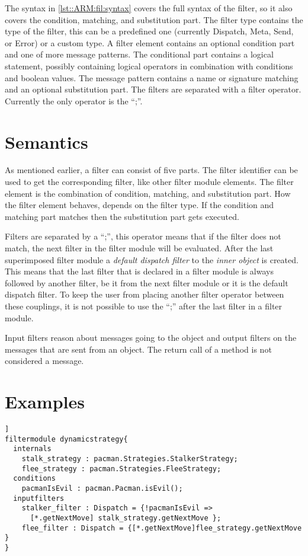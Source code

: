 The syntax in \autoref{lst::ARM:fil:syntax} covers the full syntax of the filter, so it also covers the condition, matching, and substitution part.
The filter type contains the type of the filter, this can be a predefined one (currently Dispatch, Meta, Send, or Error) or a custom type.
A filter element
contains an optional condition part and
one of more message patterns. The conditional part contains a logical statement, possibly containing logical operators in combination with conditions and boolean values. The message pattern contains a name or signature matching and an optional substitution part. The filters are separated with a filter operator. Currently the only operator is the ``;''.

\section*{Semantics}
As mentioned earlier, a filter can consist of five parts. The filter identifier can be used to get the corresponding filter,
like other filter module elements. The filter element is the combination of condition, matching, and substitution part.
How the filter element behaves, depends on the filter type. If the condition and matching part matches then the
substitution part gets executed.

Filters are separated by a ``;'', this operator means that if the filter does not match, the next filter in the filter module will be evaluated. After the last superimposed filter module a \emph{default dispatch filter} to the \emph{inner object} is created. This means that the last filter that is declared in a filter module is always followed by another filter, be it from the next filter module or it is the default dispatch filter. To keep the user from placing another filter operator between these couplings, it is not possible to use the ``;'' after the last filter in a filter module.%

Input filters reason about messages going to the object and output filters on the messages that are sent from an object. The return call of a method is not considered a message.

\section*{Examples}
\begin{lstlisting}[caption = {Dynamic strategy filter module in Pacman}, label=lst::arm::fil:example1,style = listing, language = ComposeStar,float=[tpb]]
filtermodule dynamicstrategy{
  internals
    stalk_strategy : pacman.Strategies.StalkerStrategy;
    flee_strategy : pacman.Strategies.FleeStrategy;
  conditions
    pacmanIsEvil : pacman.Pacman.isEvil();
  inputfilters
    stalker_filter : Dispatch = {!pacmanIsEvil => 
      [*.getNextMove] stalk_strategy.getNextMove };
    flee_filter : Dispatch = {[*.getNextMove]flee_strategy.getNextMove }
}
\end{lstlisting}

